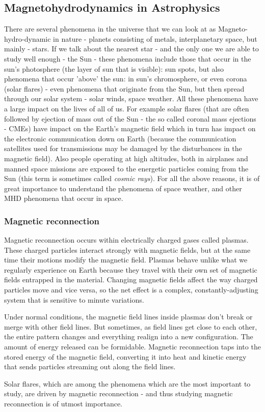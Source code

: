 \subsection{Magnetohydrodynamics in Astrophysics}
There are several phenomena in the universe that we can look at as Magneto-hydro-dynamic in nature - planets consisting of metals, interplanetary space, but mainly - stars. If we talk about the nearest star - and the only one we are able to study well enough - the Sun - these phenomena include those that occur in the sun's photosphere (the layer of sun that is visible): sun spots, but also phenomena that occur 'above' the sun: in sun's chromosphere, or even corona (solar flares) - even phenomena that originate from the Sun, but then spread through our solar system - solar winds, space weather. All these phenomena have a large impact on the lives of all of us. For example solar flares (that are often followed by ejection of mass out of the Sun - the so called coronal mass ejections - CMEs) have impact on the Earth's magnetic field which in turn has impact on the electronic communication down on Earth (because the communication satellites used for transmissions may be damaged by the disturbances in the magnetic field). Also people operating at high altitudes, both in airplanes and manned space missions are exposed to the energetic particles coming from the Sun (this term is sometimes called \textit{cosmic rays}). For all the above reasons, it is of great importance to understand the phenomena of space weather, and other MHD phenomena that occur in space.
\subsubsection{Magnetic reconnection}

Magnetic reconnection occurs within electrically charged gases called plasmas. These charged particles interact strongly with magnetic fields, but at the same time their motions modify the magnetic field. Plasmas behave unlike what we regularly experience on Earth because they travel with their own set of magnetic fields entrapped in the material. Changing magnetic fields affect the way charged particles move and vice versa, so the net effect is a complex, constantly-adjusting system that is sensitive to minute variations.

Under normal conditions, the magnetic field lines inside plasmas don't break or merge with other field lines. But sometimes, as field lines get close to each other, the entire pattern changes and everything realign into a new configuration. The amount of energy released can be formidable. Magnetic reconnection taps into the stored energy of the magnetic field, converting it into heat and kinetic energy that sends particles streaming out along the field lines.

Solar flares, which are among the phenomena which are the most important to study, are driven by magnetic reconnection - and thus studying magnetic reconnection is of utmost importance.